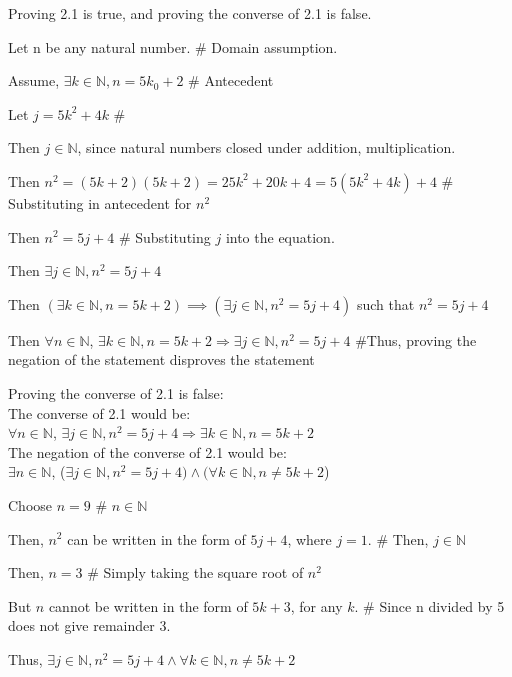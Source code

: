 \documentclass{article}
\begin{document}
\begin{enumerate}
\item Proving 2.1 is true, and proving the converse of 2.1 is false.
						\item Then $(\exists k \in \mathbb{N}, n = 5k + 2) \implies (\exists j \in \mathbb{N}, n^2 = 5j + 4)$ such that $n^2 = 5j+4$
				\end {description}
				\item Then $\forall n \in \mathbb{N}$, $\exists k \in \mathbb{N}, n = 5k+2 \Rightarrow \exists j \in \mathbb{N}, n^2 = 5j+4$ \#Thus, proving the negation of the statement disproves the statement
		\end {description}

Proving the converse of 2.1 is false:\\
The converse of 2.1 would be:\\
$\forall n \in \mathbb{N}$, $\exists j \in \mathbb{N}, n^2 = 5j+4 \Rightarrow \exists k \in \mathbb{N}, n = 5k+2$\\
The negation of the converse of 2.1 would be:\\
$\exists n \in \mathbb{N}$, ($\exists j \in \mathbb{N}, n^2 = 5j+4) \wedge (\forall k \in \mathbb{N}, n \neq 5k+2$)
		\begin {description}
				\item Choose $n = 9$ \# $n \in \mathbb{N}$
				\item Then, $n^2$ can be written in the form of $5j + 4$, where $j = 1$. \# Then, $j \in \mathbb{N}$
				\item Then, $n = 3$ \# Simply taking the square root of $n^2$
				\item But $n$ cannot be written in the form of $5k + 3$, for any $k$. \# Since n divided by 5 does not give remainder 3.
				\item Thus, $\exists j \in \mathbb{N}, n^2 = 5j+4 \wedge\forall k \in \mathbb{N}, n \neq 5k+2$ 
		

\end{description}
\end{enumerate}
\end{document}
